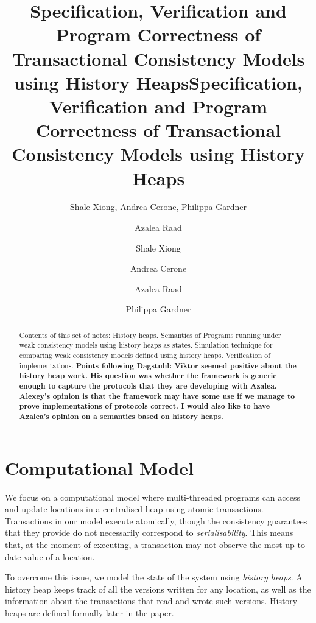 \documentclass[a4paper,UKenglish]{article}%
\title{Specification, Verification and Program Correctness of Transactional Consistency Models using History Heaps}
\title{Specification, Verification and Program Correctness of Transactional Consistency Models using History Heaps}
\author[1]{Shale Xiong, Andrea Cerone, Philippa Gardner}
\author[2]{Azalea Raad}
\affil[1]{Imperial College London, UK}
\affil[2]{MPI KaiserSlautern}
\author[1]{Shale Xiong}
\author[1]{Andrea Cerone}
\author[2]{Azalea Raad}
\author[1]{Philippa Gardner}
\affil[1]{Imperial College London, UK}
\affil[2]{MPI Kaiserslautern}
\theoremstyle{plain}
\begin{document}
\maketitle
\begin{abstract}
Contents of this set of notes: 
History heaps. Semantics of Programs 
running under weak consistency models using history heaps as states. 
Simulation technique for comparing weak consistency models defined using 
history heaps. Verification of implementations.
\textbf{Points following Dagstuhl: Viktor seemed positive about the 
history heap work. His question was whether the framework is generic 
enough to capture the protocols that they are developing with Azalea. 
Alexey's opinion is that the framework may have some use if we 
manage to prove implementations of protocols correct. 
I would also like to have Azalea's opinion on a semantics based 
on history heaps.}

\end{abstract}

\section{Computational Model}
We focus on a computational model where multi-threaded programs can access and update 
locations in a centralised heap using atomic transactions. Transactions in our model execute atomically, 
though the consistency guarantees that they provide do not necessarily correspond to \emph{serialisability}. 
This means that, at the moment of executing, a transaction may not observe the most up-to-date value 
of a location. 

To overcome this issue, we model the state of the system using \emph{history heaps}. A 
history heap keeps track of all the versions written for any location, as well as the information 
about the transactions that read and wrote such versions. History heaps are defined formally later in 
the paper.
\end{document}
